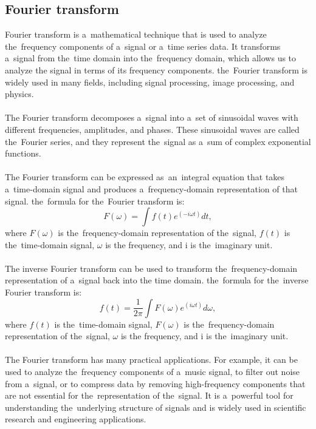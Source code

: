 \subsection{Fourier transform}\label{subsec:fourier}
Fourier transform is a~mathematical technique that is used to analyze the~frequency components of a~signal or a~time
series data. It transforms a~signal from the~time domain into the~frequency domain, which allows us to analyze the
signal in terms of its frequency components. the~Fourier transform is widely used in many fields, including signal
processing, image processing, and physics.\\
\\
The Fourier transform decomposes a~signal into a~set of sinusoidal waves with different frequencies, amplitudes, and phases.
These sinusoidal waves are called the~Fourier series, and they represent the~signal as a~sum of complex exponential functions.\\
\\
The Fourier transform can be expressed as~an~integral equation that takes a~time-domain signal and
produces a~frequency-domain representation of that signal. the~formula for the~Fourier transform is:\\
\begin{equation}
    F(\omega) = \int f(t) e^{(-i \omega t)} dt,
\end{equation}
where $F(\omega)$ is the~frequency-domain representation of the~signal, $f(t)$ is the~time-domain signal, $\omega$ is the
frequency, and i is the~imaginary unit.\\
\\
The inverse Fourier transform can be used to transform the~frequency-domain representation of a~signal back into the
time domain. the~formula for the~inverse Fourier transform is:
\begin{equation}
    f(t) = \frac{1}{2\pi} \int F(\omega) e^{(i \omega t)} d\omega,
\end{equation}
where $f(t)$ is the~time-domain signal, $F(\omega)$ is the~frequency-domain representation of the~signal, $\omega$ is the
frequency, and i is the~imaginary unit.\\
\\
The Fourier transform has many practical applications. For example, it can be used to analyze the~frequency components
of a~music signal, to filter out noise from a~signal, or to compress data by removing high-frequency components that
are not essential for the~representation of the~signal.  It is a~powerful tool for understanding the~underlying
structure of signals and is widely used in scientific research and engineering applications.

